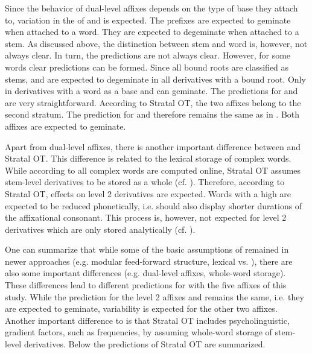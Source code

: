 Since the behavior of dual-level affixes depends on the type of base they attach to, variation in the  of  and  is expected. The prefixes are expected to geminate when attached to a word. They are expected to degeminate when attached to a stem. As discussed above, the distinction between stem and word is, however, not always clear. In turn, the predictions are not always clear. However, for some words clear predictions can be formed. Since all bound roots are classified as stems,  and  are expected to degeminate in all derivatives with a bound root. Only in derivatives with a word as a base  and  can geminate.
The predictions for  and  are very straightforward. According to Stratal OT, the two affixes belong to the second stratum. The prediction for  and  therefore remains the same as in . Both affixes are expected to geminate.



Apart from dual-level affixes, there is another important difference between  and Stratal OT.  This difference is related to the {lexical storage} of complex words. While according to  all complex words are computed online, Stratal OT assumes stem-level derivatives to be stored as a whole (cf. \citealt[Chapter 3]{BermudezOtero.2012}). Therefore, according to Stratal OT,  effects on level 2 derivatives are expected.  Words with a high  are expected to be reduced phonetically, i.e. should also display shorter durations of the affixational consonant. This  process is, however, not expected for level 2 derivatives which are only stored analytically (cf. \citealt[Chapter 3.3]{BermudezOtero.2012}). 



One can summarize that while some of the basic assumptions of  remained in newer approaches (e.g. modular feed-forward structure, lexical vs. ), there are also some important differences (e.g. dual-level affixes, {whole-word storage}). These differences lead to different predictions for  with the five affixes of this study. While the prediction for the level 2 affixes  and  remains the same, i.e. they are expected to geminate, variability is expected for the other two affixes. Another important difference to  is that Stratal OT includes psycholinguistic, gradient factors, such as frequencies, by assuming {whole-word storage} of stem-level derivatives. Below the predictions of Stratal OT are summarized.


